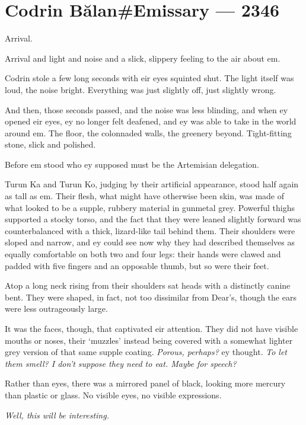 \hypertarget{codrin-bux103lanemissary-2346}{%
\chapter{Codrin Bălan\#Emissary — 2346}\label{codrin-bux103lanemissary-2346}}

Arrival.

Arrival and light and noise and a slick, slippery feeling to the air about em.

Codrin stole a few long seconds with eir eyes squinted shut. The light itself was loud, the noise bright. Everything was just slightly off, just slightly wrong.

And then, those seconds passed, and the noise was less blinding, and when ey opened eir eyes, ey no longer felt deafened, and ey was able to take in the world around em. The floor, the colonnaded walls, the greenery beyond. Tight-fitting stone, slick and polished.

Before em stood who ey supposed must be the Artemisian delegation.

Turun Ka and Turun Ko, judging by their artificial appearance, stood half again as tall as em. Their flesh, what might have otherwise been skin, was made of what looked to be a supple, rubbery material in gunmetal grey. Powerful thighs supported a stocky torso, and the fact that they were leaned slightly forward was counterbalanced with a thick, lizard-like tail behind them. Their shoulders were sloped and narrow, and ey could see now why they had described themselves as equally comfortable on both two and four legs: their hands were clawed and padded with five fingers and an opposable thumb, but so were their feet.

Atop a long neck rising from their shoulders sat heads with a distinctly canine bent. They were shaped, in fact, not too dissimilar from Dear's, though the ears were less outrageously large.

It was the faces, though, that captivated eir attention. They did not have visible mouths or noses, their `muzzles' instead being covered with a somewhat lighter grey version of that same supple coating. \emph{Porous, perhaps?} ey thought. \emph{To let them smell? I don't suppose they need to eat. Maybe for speech?}

Rather than eyes, there was a mirrored panel of black, looking more mercury than plastic or glass. No visible eyes, no visible expressions.

\emph{Well, this will be interesting.}

